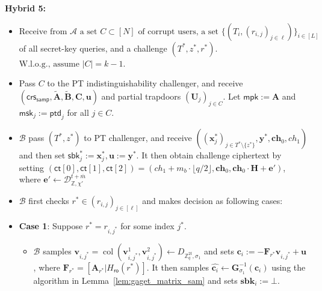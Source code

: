 \noindent\textbf{Hybrid 5:}
\begin{itemize}
    \item $\text{Receive from } \mathcal{A} \text{ a set } C \subset [N] \text{ of corrupt users, a set }
\{(T_i,(r_{i,j})_{j \in \ell})\}_{i \in [L]}$ of all secret-key queries, and a challenge $(T^\ast, z^\ast, r^\ast).$
$\text{W.l.o.g., assume } |C| = k - 1.$
    \item Pass $C$ to the PT indistinguishability challenger, and receive $(\mathsf{crs_{samp}}, \mathbf{\tilde{A}},\mathbf{\tilde{B}},\mathbf{C},\mathbf{u})$ and partial trapdoors 
    $(\mathbf{U}_j)_{j \in C}$. Let $\mathsf{mpk} := \mathbf{A}$ and 
    $\mathsf{msk}_j := \mathsf{ptd}_j$ for all $j \in C$.


\item $\mathcal{B}$ pass $(T^*, z^*)$ to PT challenger, and receive $\left((\mathbf{x}_j^*)_{j\in T^*\setminus\{z^*\}}, \mathbf{y}^*, \mathbf{ch}_0, ch_1\right)$  and then set $\mathsf{sbk}^*_j := \mathbf{x}^*_j, \mathbf{u} := \mathbf{y}^*$. It then obtain challenge ciphertext by setting $(\mathsf{ct}[0],\mathsf{ct}[1],\mathsf{ct}[2]) = (ch_1 + m_b\cdot\lfloor q/2\rfloor,\mathbf{ch}_0, \mathbf{ch}_0\cdot \mathbf{H} + \mathbf{e}')$, where $\mathbf{e}'\leftarrow\mathcal{D}_{\mathbb{Z},\chi'}^{t + \overline{m}}$

\item $\mathcal{B}$ first checks $r^* \in (r_{i,j})_{j \in [\ell]}$ and makes decision as following cases:
\item \textbf{Case 1}: Suppose $r^* = r_{i,j^*}$ for some index $j^*$. 
\begin{itemize}
    \item $\mathcal{B}$ samples
$\mathbf{v}_{i,j^*}=\operatorname{col}(\mathbf{v}_{i,j^*}^1,\mathbf{v}_{i,j^*}^2)
\leftarrow D_{\mathbb{Z}_q^{2t},\sigma_1}$ and sets
$\mathbf{c}_i:=-\mathbf{F}_{r^*}\mathbf{v}_{i,j^*}+\mathbf{u}$, where
$\mathbf{F}_{r^*}=[\mathbf{A}_{r^*}| H_{\mathsf{ro}}(r^*)]$. It then samples $\widehat{\mathbf{c}_i}\leftarrow \mathbf{G}_{\sigma_1}^{-1}(\mathbf{c}_i)$
using the algorithm in Lemma~\ref{lem:gaget_matrix_sam} and sets $\mathbf{sbk}_i := \bot$.


\end{itemize}
\end{itemize}
